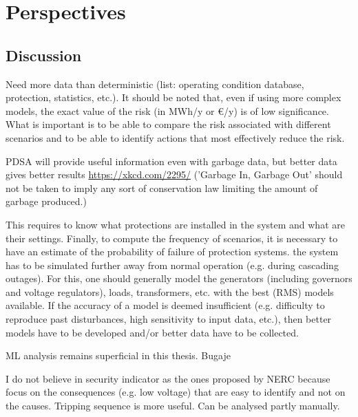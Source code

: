 \chapter{Perspectives}
\label{ch:perspectives}



\section{Discussion}

Need more data than deterministic (list: operating condition database, protection, statistics, etc.). It should be noted that, even if using more complex models, the exact value of the risk (in MWh/y or €/y) is of low significance. What is important is to be able to compare the risk associated with different scenarios and to be able to identify actions that most effectively reduce the risk.

PDSA will provide useful information even with garbage data, but better data gives better results \url{https://xkcd.com/2295/} ('Garbage In, Garbage Out' should not be taken to imply any sort of conservation law limiting the amount of garbage produced.)



This requires to know what protections are installed in the system and what are their settings. Finally, to compute the frequency of scenarios, it is necessary to have an estimate of the probability of failure of protection systems. the system has to be simulated further away from normal operation (e.g. during cascading outages). For this, one should generally model the generators (including governors and voltage regulators), loads, transformers, etc. with the best (RMS) models available. If the accuracy of a model is deemed insufficient (e.g. difficulty to reproduce past disturbances, high sensitivity to input data, etc.), then better models have to be developed and/or better data have to be collected.

ML analysis remains superficial in this thesis. Bugaje

I do not believe in security indicator as the ones proposed by NERC because focus on the consequences (e.g. low voltage) that are easy to identify and not on the causes. Tripping sequence is more useful. Can be analysed partly manually.



